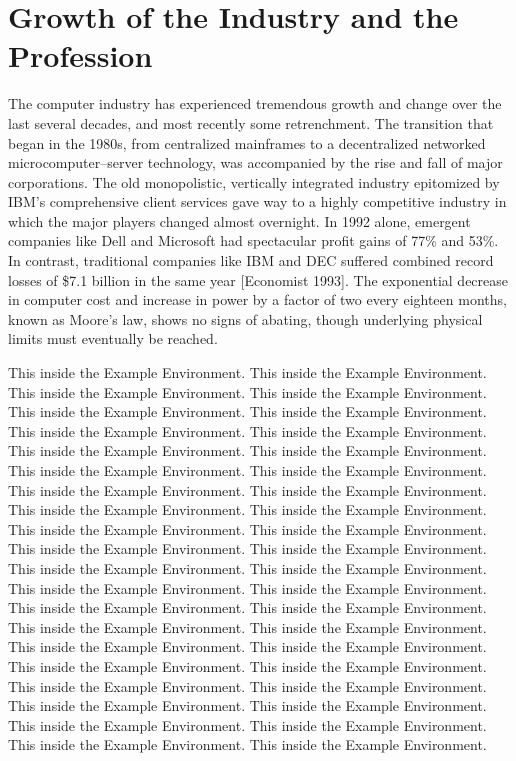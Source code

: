 \section{Growth of the Industry and the Profession}

\noindent 
The computer industry has experienced tremendous growth and
change over the last several decades, and most recently some
retrenchment. The transition that began in the 1980s, from
centralized mainframes to a decentralized networked
microcomputer--server technology, was accompanied by the rise and
fall of major corporations. The old monopolistic, vertically
integrated industry epitomized by IBM's comprehensive client services
gave way to a highly competitive industry
 in which the major players changed almost
overnight. In 1992 alone, emergent companies like Dell and
Microsoft had spectacular profit gains of 77\% and 53\%. In
contrast, traditional companies like IBM and DEC suffered
combined record losses of \$7.1 billion in the same year
[Economist 1993]. The exponential decrease in computer cost and
increase in power by a factor of two every eighteen months,
known as Moore's law, shows no signs of abating, though
underlying physical limits must eventually be reached.

\begin{example}
This inside the Example Environment. This inside the Example Environment. 
This inside the Example Environment. This inside the Example Environment. 
This inside the Example Environment. This inside the Example Environment. 
This inside the Example Environment. This inside the Example Environment. 
This inside the Example Environment. This inside the Example Environment. 
This inside the Example Environment. This inside the Example Environment. 
This inside the Example Environment. This inside the Example Environment. 
This inside the Example Environment. This inside the Example Environment. 
This inside the Example Environment. This inside the Example Environment. 
This inside the Example Environment. This inside the Example Environment. 
This inside the Example Environment. This inside the Example Environment. 
This inside the Example Environment. This inside the Example Environment. 
This inside the Example Environment. This inside the Example Environment. 
This inside the Example Environment. This inside the Example Environment. 
This inside the Example Environment. This inside the Example Environment. 
This inside the Example Environment. This inside the Example Environment. 
This inside the Example Environment. This inside the Example Environment. 
This inside the Example Environment. This inside the Example Environment. 
This inside the Example Environment. This inside the Example Environment. 
This inside the Example Environment. This inside the Example Environment.
\end{example}

